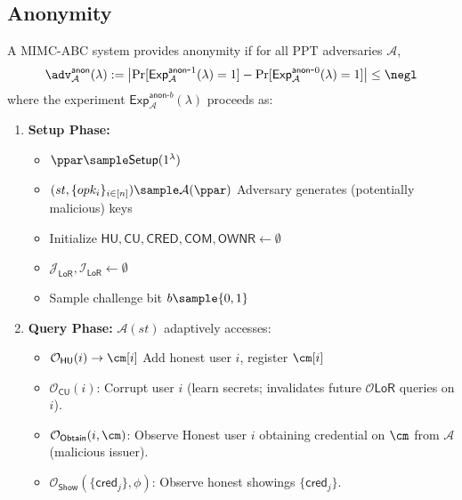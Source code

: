 \newpage
\subsection{Anonymity} 

\begin{definition}
A MIMC-ABC system provides anonymity if for all PPT adversaries $\mathcal{A}$,
\[
\adv^{\mathsf{anon}}_{\mathcal{A}}(\lambda) := \left|\Pr[\mathsf{Exp}^{\mathsf{anon}\mbox{-}1}_{\mathcal{A}}(\lambda)=1] - \Pr[\mathsf{Exp}^{\mathsf{anon}\mbox{-}0}_{\mathcal{A}}(\lambda)=1]\right| \leq \negl
\]
where the experiment $\mathsf{Exp}^{\mathsf{anon}\mbox{-}b}_{\mathcal{A}}(\lambda)$ proceeds as:
\end{definition}

\begin{enumerate}
    \item \textbf{Setup Phase:}
    \begin{itemize}
        \item $\ppar \sample \mathsf{Setup}(1^\lambda)$
        \item $(st, \{opk_i\}_{i \in [n]}) \sample \mathcal{A}(\ppar)$ Adversary generates (potentially malicious) keys
        \item Initialize $\mathsf{HU}, \mathsf{CU}, \mathsf{CRED}, \mathsf{COM}, \mathsf{OWNR} \gets \emptyset$
        \item $\mathcal{J}_{\mathsf{LoR}}, \mathcal{I}_{\mathsf{LoR}} \gets \emptyset$ 
        \item Sample challenge bit $b \sample \{0,1\}$
    \end{itemize}

    \item \textbf{Query Phase:} $\mathcal{A}(st)$ adaptively accesses:
    \begin{itemize}
        \item $\mathcal{O}_{\mathsf{HU}}(i) \rightarrow \cm[i]$ Add honest user $i$, register $\cm[i]$
        
        \item $\mathcal{O}_{\mathsf{CU}}(i)$: Corrupt user $i$ (learn secrets; invalidates future $\mathcal{O}{\mathsf{LoR}}$ queries on $i$).  
        
        \item $\mathcal{O}_{\mathsf{Obtain}}(i, \cm)$: Observe Honest user $i$ obtaining credential on $\cm$ from $\mathcal{A}$ (malicious issuer).
        
        \item $\mathcal{O}_{\mathsf{Show}}(\{\mathsf{cred}_j\}, \phi)$: Observe honest showings $\{\mathsf{cred}_j\}$. 
        

\end{itemize}
\end{enumerate}
